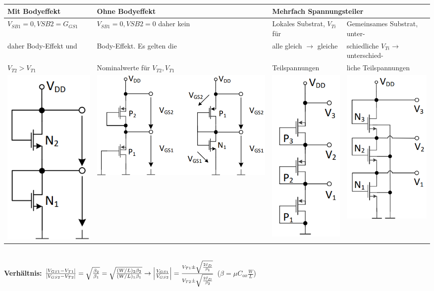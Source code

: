 \begin{tabular}{|l|l|l|l|}
    \hline
    \textbf{Mit Bodyeffekt}     & \textbf{Ohne Bodyeffekt}      & \multicolumn{2}{l|}{\textbf{Mehrfach Spannungsteiler}} \\
    \hline
    $V_{SB1} = 0, V{SB2} = G_{GS1}$ & $V_{SB1} = 0, V{SB2} = 0$ daher kein  & Lokales Substrat, $V_{Ti}$ für        & Gemeinsames Substrat, unter- \\
    daher Body-Effekt und           & Body-Effekt. Es gelten die            & alle gleich $\rightarrow$ gleiche     & schiedliche $V_{Ti} \rightarrow$ unterschied- \\
    $V_{T2}>V_{T1}$                 & Nominalwerte für $V_{T2},V_{T1}$      & Teilspannungen                        & liche Teilspannungen \\
    \includegraphics[width=0.08\linewidth]{Spannungsteiler_mit Body_Effekt.png}    & \includegraphics[width=0.22\linewidth]{Spannungsteiler_ohne Body_Effekt.png}  & \includegraphics[angle=90,width=0.2\linewidth]{Mehrfach_Spannungsteiler_getrennte Substrate.png}   & \includegraphics[angle=90, width=0.2\linewidth]{Mehrfach_Spannungsteiler_gemeinsame Substrate.png}\\
    \hline
\end{tabular}\vspace{5pt}\\
\textbf{Verhältnis:} $\frac{|V_{GS1}-V_{T1}|}{|V_{GS2}-V_{T2}|}= \sqrt{\frac{\beta_2}{\beta_1}}=\sqrt{\frac{(W/L)_2\beta_2}{(W/L)_1\beta_1}}\rightarrow \Bigl|\frac{V_{GS1}}{V_{GS2}}\Bigr| = \frac{V_{T1}\pm\sqrt{\frac{2I_D}{\beta_1}}}{V_{T2}\pm\sqrt{\frac{2I_D}{\beta_2}}}$ \hspace{20pt}($\beta = \mu C_{ox} \frac{W}{L}$)
